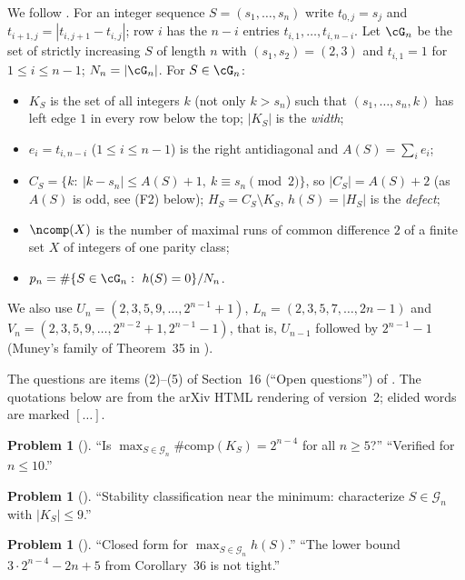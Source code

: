 \documentclass[11pt,a4paper]{article}
\theoremstyle{definition}
\newtheorem{problem}[theorem]{Problem}
\theoremstyle{remark}
\numberwithin{equation}{section}
\begin{document}
We follow \cite{R003}. For an integer sequence $S=(s_1,\dots,s_n)$ write
$t_{0,j}=s_j$ and $t_{i+1,j}=|t_{i,j+1}-t_{i,j}|$; row $i$ has the $n-i$ entries
$t_{i,1},\dots,t_{i,n-i}$. Let $\cG_n$ be the set of strictly increasing $S$ of length $n$ with
$(s_1,s_2)=(2,3)$ and $t_{i,1}=1$ for $1\le i\le n-1$; $N_n=|\cG_n|$. For $S\in\cG_n$:
\begin{itemize}
\item $K_S$ is the set of all integers $k$ (not only $k>s_n$) such that $(s_1,\dots,s_n,k)$
 has left edge $1$ in every row below the top; $|K_S|$ is the \emph{width};
\item $e_i=t_{i,n-i}$ ($1\le i\le n-1$) is the right antidiagonal and $A(S)=\sum_i e_i$;
\item $C_S=\{k:\ |k-s_n|\le A(S)+1,\ k\equiv s_n \pmod 2\}$, so $|C_S|=A(S)+2$ (as $A(S)$ is odd, see (F2) below);
 $H_S=C_S\setminus K_S$, $h(S)=|H_S|$ is the \emph{defect};
\item $\ncomp(X)$ is the number of maximal runs of common difference $2$ of a finite set $X$
 of integers of one parity class;
\item $p_n=\#\{S\in\cG_n:\ h(S)=0\}/N_n$.
\end{itemize}
We also use $U_n=(2,3,5,9,\dots,2^{n-1}+1)$, $L_n=(2,3,5,7,\dots,2n-1)$ and
$V_n=(2,3,5,9,\dots,2^{n-2}+1,2^{n-1}-1)$, that is, $U_{n-1}$ followed by $2^{n-1}-1$
(Muney's family of Theorem~35 in \cite{R003}).

The questions are items (2)--(5) of Section~16 (``Open questions'') of
\cite{R003}. The quotations below are from the arXiv HTML rendering of version~2; elided words
are marked $[\dots]$.

\begin{problem}[{\cite[Sect.~16, item (4)]{R003}}]\label{B:G:prob:comp}
``Is $\max_{S\in\mathcal{G}_n}\#\mathrm{comp}(K_S)=2^{n-4}$ for all $n\ge 5$?''
``Verified for $n\le 10$.''
\end{problem}

\begin{problem}[{\cite[Sect.~16, item (5)]{R003}}]\label{B:G:prob:small}
``Stability classification near the minimum: characterize $S\in\mathcal{G}_n$ with
$|K_S|\le 9$.''
\end{problem}

\begin{problem}[{\cite[Sect.~16, item (3)]{R003}}]\label{B:G:prob:defect}
``Closed form for $\max_{S\in\mathcal{G}_n}h(S)$.''
``The lower bound $3\cdot 2^{n-4}-2n+5$ from Corollary~36 is not tight.''
\end{problem}
\end{document}
